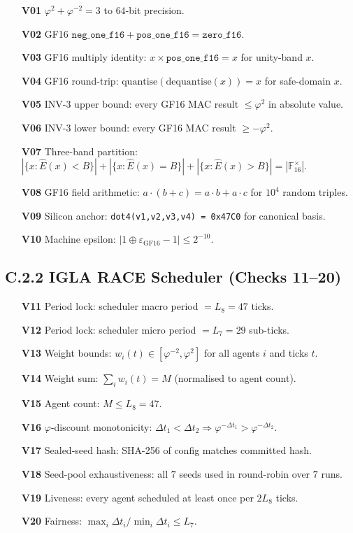 \begin{enumerate}
\item[\textbf{V01}] $\varphi^2 + \varphi^{-2} = 3$ to $64$-bit precision.
\item[\textbf{V02}] GF16 $\texttt{neg\_one\_f16} + \texttt{pos\_one\_f16} = \texttt{zero\_f16}$.
\item[\textbf{V03}] GF16 multiply identity: $x \times \texttt{pos\_one\_f16} = x$ for unity-band $x$.
\item[\textbf{V04}] GF16 round-trip: $\mathrm{quantise}(\mathrm{dequantise}(x)) = x$ for safe-domain $x$.
\item[\textbf{V05}] INV-3 upper bound: every GF16 MAC result $\leq \varphi^2$ in absolute value.
\item[\textbf{V06}] INV-3 lower bound: every GF16 MAC result $\geq -\varphi^2$.
\item[\textbf{V07}] Three-band partition: $|\{x : \hat{E}(x) < B\}| + |\{x : \hat{E}(x) = B\}| + |\{x : \hat{E}(x) > B\}| = |\mathbb{F}_{16}^{\times}|$.
\item[\textbf{V08}] GF16 field arithmetic: $a \cdot (b + c) = a \cdot b + a \cdot c$ for $10^4$ random triples.
\item[\textbf{V09}] Silicon anchor: \texttt{dot4(v1,v2,v3,v4) = 0x47C0} for canonical basis.
\item[\textbf{V10}] Machine epsilon: $|1 \oplus \varepsilon_{\mathrm{GF16}} - 1| \leq 2^{-10}$.
\end{enumerate}

\subsection*{C.2.2 IGLA RACE Scheduler (Checks 11--20)}

\begin{enumerate}
\item[\textbf{V11}] Period lock: scheduler macro period $= L_8 = 47$ ticks.
\item[\textbf{V12}] Period lock: scheduler micro period $= L_7 = 29$ sub-ticks.
\item[\textbf{V13}] Weight bounds: $w_i(t) \in [\varphi^{-2}, \varphi^{2}]$ for all agents $i$ and ticks $t$.
\item[\textbf{V14}] Weight sum: $\sum_i w_i(t) = M$ (normalised to agent count).
\item[\textbf{V15}] Agent count: $M \leq L_8 = 47$.
\item[\textbf{V16}] $\varphi$-discount monotonicity: $\Delta t_1 < \Delta t_2 \Rightarrow \varphi^{-\Delta t_1} > \varphi^{-\Delta t_2}$.
\item[\textbf{V17}] Sealed-seed hash: SHA-256 of config matches committed hash.
\item[\textbf{V18}] Seed-pool exhaustiveness: all $7$ seeds used in round-robin over $7$ runs.
\item[\textbf{V19}] Liveness: every agent scheduled at least once per $2 L_8$ ticks.
\item[\textbf{V20}] Fairness: $\max_i \Delta t_i / \min_i \Delta t_i \leq L_7$.
\end{enumerate}

